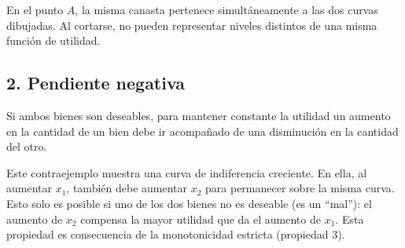 \documentclass{article}
\begin{document}
\begin{center}
\end{center}

En el punto \(A\), la misma canasta pertenece simultáneamente a las dos curvas dibujadas. Al cortarse, {\color{teal}no pueden representar niveles distintos de una misma función de utilidad}.

\subsection*{2. Pendiente negativa}

Si ambos bienes son deseables, para mantener constante la utilidad un aumento en la cantidad de un bien debe ir acompañado de una disminución en la cantidad del otro.

\begin{center}
\end{center}

Este contraejemplo muestra una curva de indiferencia {\color{teal}creciente}. En ella, al aumentar \(x_1\), también debe aumentar \(x_2\) para permanecer sobre la misma curva. Esto solo es posible si uno de los dos bienes no es deseable (es un ``mal''): el aumento de \(x_2\) compensa la mayor utilidad que da el aumento de \(x_1\). Esta propiedad es consecuencia de la monotonicidad estricta (propiedad 3).
\end{document}
